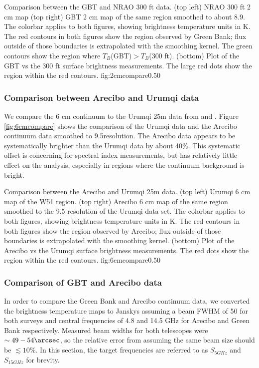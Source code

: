 {Comparison between the GBT and NRAO 300 ft \citep{Langston2000a} data.
(top left) NRAO 300 ft 2 cm map
(top right) GBT 2 cm map of the same region smoothed to about 8.9\arcmin. 
The colorbar applies to both figures,
showing brightness temperature units in K.  The red contours in both figures
show the region observed by Green Bank; flux outside of those boundaries is
extrapolated with the smoothing kernel.  The green contours show the region
where $T_B$(GBT)$>T_B$(300 ft).  (bottom) Plot of the GBT vs the 300 ft surface
brightness measurements.
The large red dots show the region within the red contours.  
}
{fig:2cmcompare}{0.5}{0}

\subsubsection{Comparison between Arecibo and Urumqi data}
We compare the 6 cm continuum to the Urumqi 25m data from \citet{Sun2007a} and
\citet{Sun2011a}.  Figure \ref{fig:6cmcompare} shows the comparison of the
Urumqi data and the Arecibo continuum data smoothed to 9.5\arcmin resolution.
The Arecibo data appears to be systematically brighter than the Urumqi data
by about 40\%.  This systematic offset is concerning for spectral index
measurements, but has relatively little effect on the \formaldehyde analysis,
especially in regions where the continuum background is bright.


{Comparison between the Arecibo and Urumqi 25m \citep{Sun2011b} data.
(top left) Urumqi 6 cm map of the W51 region.
(top right) Arecibo 6 cm map of the same region smoothed to the 9.5\arcmin
resolution of the Urumqi data set.  The colorbar applies to both figures,
showing brightness temperature units in K.  The red contours in both figures
show the region observed by Arecibo; flux outside of those boundaries is
extrapolated with the smoothing kernel. 
(bottom) Plot of the Arecibo vs the Urumqi surface brightness measurements.
The red dots show the region within the red contours.
}
{fig:6cmcompare}{0.5}{0}


\subsubsection{Comparison of GBT and Arecibo data}
In order to compare the Green Bank and Arecibo continuum data, we converted
the brightness temperature maps to Janskys assuming a beam FWHM of 50\arcsec
for both surveys and central frequencies of 4.8 and 14.5 GHz for Arecibo and
Green Bank respectively.  Measured beam widths for both telescopes were
$\sim49-54\arcsec$, so the relative error from assuming the same beam size
should be $\lesssim10\%$.
In this section, the target frequencies are referred
to as $S_{5 GHz}$ and $S_{15 GHz}$ for brevity.

